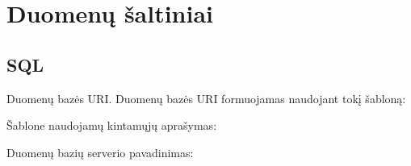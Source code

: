 \documentclass[letterpaper,10pt,lithuanian]{sphinxmanual}
\begin{document}
\sphinxstepscope


\section{Duomenų šaltiniai}
\label{\detokenize{saltiniai:duomenu-saltiniai}}\label{\detokenize{saltiniai:id1}}\label{\detokenize{saltiniai::doc}}

\subsection{SQL}
\label{\detokenize{saltiniai:sql}}\label{\detokenize{saltiniai:resource-type-sql}}\label{\detokenize{saltiniai:sql-resource-source}}

\begin{fulllineitems}

\pysigstartsignatures
\pysigline
{}
\pysigstopsignatures
\sphinxAtStartPar
Duomenų bazės URI. Duomenų bazės URI formuojamas naudojant tokį 
šabloną:

\begin{sphinxVerbatim}[commandchars=\\\{\}]
\PYG{p}{[}\PYG{p}{]}
\PYG{p}{[}\PYG{p}{[}\PYG{p}{]}\PYG{p}{]}
\PYG{p}{[}\PYG{p}{]}
\PYG{p}{[}\PYG{p}{]}
\end{sphinxVerbatim}

\sphinxAtStartPar
Šablone naudojamų kintamųjų aprašymas:


\begin{fulllineitems}

\pysigstartsignatures
\pysigline
{}
\pysigstopsignatures
\sphinxAtStartPar
Duomenų bazių serverio pavadinimas:


\begin{fulllineitems}

\pysigstartsignatures
\pysigline
{}
\pysigstopsignatures
\end{fulllineitems}




\end{fulllineitems}
\end{fulllineitems}
\end{document}
